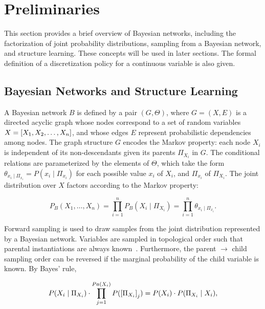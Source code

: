 
\section{Preliminaries}
\label{sec:preliminaries}
This section provides a brief overview of Bayesian networks, including the factorization of joint probability distributions, sampling from a Bayesian network, and structure learning. These concepts will be used in later sections. The formal definition of a discretization policy for a continuous variable is also given.

\subsection{Bayesian Networks and Structure Learning}

A Bayesian network $B$ is defined by a pair $(G,\Theta)$, where $G = (X,E)$ is a directed acyclic graph whose nodes correspond to a set of random variables $X = \brock{X_1, X_2, \ldots, X_n}$, and whose edges $E$ represent probabilistic dependencies among nodes.
The graph structure $G$ encodes the Markov property: each node $X_i$ is independent of its non-descendants given its parents $\Pi_{X_i}$ in $G$.
The conditional relations are parameterized by the elements of $\Theta$, which take the form $\theta_{x_i \mid \Pi_{x_i}} = P(x_i \mid \Pi_{x_i})$ for each possible value $x_i$ of $X_i$, and $\Pi_{x_i}$ of $\Pi_{X_i}$. The joint distribution over $X$ factors according to the Markov property:

\begin{equation}
P_B (X_1 , \ldots, X_n) = \prod_{i=1}^{n} P_B (X_i \mid \Pi_{X_i}) = \prod_{i=1}^{n} \theta_{x_i \mid \Pi_{x_i}}\text{.}
\end{equation}

Forward sampling is used to draw samples from the joint distribution represented by a Bayesian network.
Variables are sampled in topological order such that parental instantiations are always known~\citep[see][chap.~22]{algo_2009}.
Furthermore, the parent $\rightarrow$ child sampling order can be reversed if the marginal probability of the child variable is known.
By Bayes' rule,

\begin{equation}
P(X_i \mid \Pi_{X_i}) \cdot \prod_{j = 1}^{ Pa( X_i)} P( \brock{\Pi_{X_i} }_j) = P(X_i) \cdot P(\Pi_{X_i} \mid X_i),
\end{equation}

